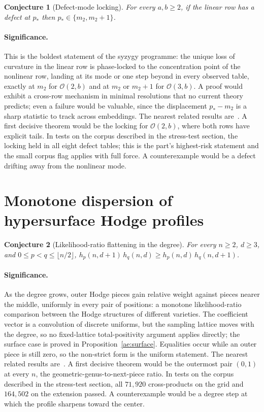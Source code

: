 \documentclass[11pt]{article}
\newtheorem{conjecture}{Conjecture}
\theoremstyle{definition}
\begin{document}
\begin{conjecture}[Defect-mode locking]\label{ae11}
For every $a,b\ge2$, if the linear row has a defect at $p_{*}$ then $p_{*}\in\{m_2,m_2+1\}$.
\end{conjecture}

\paragraph{Significance.}
This is the boldest statement of the syzygy programme: the unique loss of curvature in the linear row is phase-locked to the concentration point of the nonlinear row, landing at its mode or one step beyond in every observed table, exactly at $m_2$ for $\mathcal O(2,b)$ and at $m_2$ or $m_2+1$ for $\mathcal O(3,b)$.  A proof would exhibit a cross-row mechanism in minimal resolutions that no current theory predicts; even a failure would be valuable, since the displacement $p_{*}-m_2$ is a sharp statistic to track across embeddings.  The nearest related results are~\cite{BCEGLY22,EEL15,Lem21}.  A first decisive theorem would be the locking for $\mathcal O(2,b)$, where both rows have explicit tails.  In tests on the corpus described in the stress-test section, the locking held in all eight defect tables; this is the part's highest-risk statement and the small corpus flag applies with full force.  A counterexample would be a defect drifting away from the nonlinear mode.

\section{Monotone dispersion of hypersurface Hodge profiles}

\begin{conjecture}[Likelihood-ratio flattening in the degree]\label{ae12}
For every $n\ge2$, $d\ge3$, and $0\le p<q\le\lfloor n/2\rfloor$, $h_p(n,d+1)\,h_q(n,d)\ge h_p(n,d)\,h_q(n,d+1)$.
\end{conjecture}

\paragraph{Significance.}
As the degree grows, outer Hodge pieces gain relative weight against pieces nearer the middle, uniformly in every pair of positions: a monotone likelihood-ratio comparison between the Hodge structures of different varieties.  The coefficient vector is a convolution of discrete uniforms, but the sampling lattice moves with the degree, so no fixed-lattice total-positivity argument applies directly; the surface case is proved in Proposition~\ref{ae:surface}.  Equalities occur while an outer piece is still zero, so the non-strict form is the uniform statement.  The nearest related results are~\cite{Gri69,DK86}.  A first decisive theorem would be the outermost pair $(0,1)$ at every $n$, the geometric-genus-to-next-piece ratio.  In tests on the corpus described in the stress-test section, all $71{,}920$ cross-products on the grid and $164{,}502$ on the extension passed.  A counterexample would be a degree step at which the profile sharpens toward the center.
\end{document}
